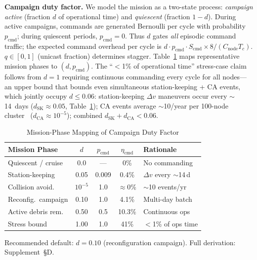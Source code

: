 \documentclass[journal]{IEEEtran}
\begin{document}
\textbf{Campaign duty factor.} We model the mission as a two-state process: \emph{campaign active} (fraction $d$ of operational time) and \emph{quiescent} (fraction $1 - d$). During active campaigns, commands are generated Bernoulli per cycle with probability $p_{\text{cmd}}$; during quiescent periods, $p_{\text{cmd}} = 0$. Thus $d$ gates \emph{all} episodic command traffic; the expected command overhead per cycle is $d \cdot p_{\text{cmd}} \cdot S_{\text{cmd}} \times 8 / (C_{\text{node}} T_c)$. $q \in [0,1]$ (unicast fraction) determines stagger. Table~\ref{tab:mission_phase_d} maps representative mission phases to $(d, p_{\text{cmd}})$. The ``$<$1\% of operational time'' stress-case claim follows from $d = 1$ requiring continuous commanding every cycle for all nodes---an upper bound that bounds even simultaneous station-keeping + CA events, which jointly occupy $d \leq 0.06$: station-keeping $\Delta v$ maneuvers occur every ${\sim}$14~days ($d_{\text{SK}} \approx 0.05$, Table~\ref{tab:mission_phase_d}); CA events average ${\sim}$10/year per 100-node cluster~\cite{esa_space_env} ($d_{\text{CA}} \approx 10^{-5}$); combined $d_{\text{SK}} + d_{\text{CA}} < 0.06$.

\begin{table}[t]
    \centering
    \caption{Mission-Phase Mapping of Campaign Duty Factor}
    \label{tab:mission_phase_d}
    \footnotesize
    \begin{tabular}{@{}lcccp{2.2cm}@{}}
        \toprule
        \textbf{Mission Phase} & $d$ & $p_{\text{cmd}}$ & $\eta_{\text{cmd}}$ & \textbf{Rationale} \\
        \midrule
        Quiescent / cruise & 0.0 & --- & 0\% & No commanding \\
        Station-keeping & 0.05 & 0.009 & 0.4\% & $\Delta v$ every ${\sim}$14\,d \\
        Collision avoid. & $10^{-5}$ & 1.0 & $\approx$0\% & ${\sim}$10 events/yr \\
        Reconfig.\ campaign & 0.10 & 1.0 & 4.1\% & Multi-day batch \\
        Active debris rem. & 0.50 & 0.5 & 10.3\% & Continuous ops \\
        Stress bound & 1.00 & 1.0 & 41\% & $<$1\% of ops time \\
        \bottomrule
    \end{tabular}
\end{table}

\noindent Recommended default: $d = 0.10$ (reconfiguration campaign). Full derivation: Supplement~\S D.
\end{document}
